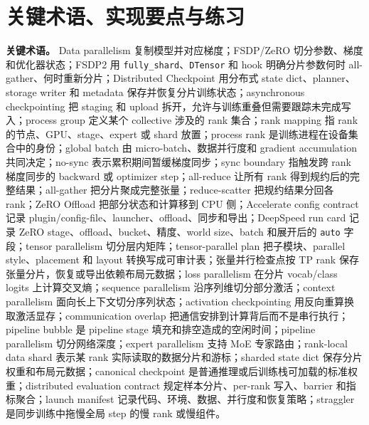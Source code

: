 \documentclass[UTF8,zihao=-4,openany]{ctexbook}
\begin{document}
\section{关键术语、实现要点与练习}
\textbf{关键术语。} Data parallelism 复制模型并对应梯度；FSDP/ZeRO 切分参数、梯度和优化器状态；FSDP2 用 \texttt{fully\_shard}、\texttt{DTensor} 和 hook 明确分片参数何时 all-gather、何时重新分片；Distributed Checkpoint 用分布式 state dict、planner、storage writer 和 metadata 保存并恢复分片训练状态；asynchronous checkpointing 把 staging 和 upload 拆开，允许与训练重叠但需要跟踪未完成写入；process group 定义某个 collective 涉及的 rank 集合；rank mapping 指 rank 的节点、GPU、stage、expert 或 shard 放置；process rank 是训练进程在设备集合中的身份；global batch 由 micro-batch、数据并行度和 gradient accumulation 共同决定；no-sync 表示累积期间暂缓梯度同步；sync boundary 指触发跨 rank 梯度同步的 backward 或 optimizer step；all-reduce 让所有 rank 得到规约后的完整结果；all-gather 把分片聚成完整张量；reduce-scatter 把规约结果分回各 rank；ZeRO Offload 把部分状态和计算移到 CPU 侧；Accelerate config contract 记录 plugin/config-file、launcher、offload、同步和导出；DeepSpeed run card 记录 ZeRO stage、offload、bucket、精度、world size、batch 和展开后的 \texttt{auto} 字段；tensor parallelism 切分层内矩阵；tensor-parallel plan 把子模块、parallel style、placement 和 layout 转换写成可审计表；张量并行检查点按 TP rank 保存张量分片，恢复或导出依赖布局元数据；loss parallelism 在分片 vocab/class logits 上计算交叉熵；sequence parallelism 沿序列维切分部分激活；context parallelism 面向长上下文切分序列状态；activation checkpointing 用反向重算换取激活显存；communication overlap 把通信安排到计算背后而不是串行执行；pipeline bubble 是 pipeline stage 填充和排空造成的空闲时间；pipeline parallelism 切分网络深度；expert parallelism 支持 MoE 专家路由；rank-local data shard 表示某 rank 实际读取的数据分片和游标；sharded state dict 保存分片权重和布局元数据；canonical checkpoint 是普通推理或后训练栈可加载的标准权重；distributed evaluation contract 规定样本分片、per-rank 写入、barrier 和指标聚合；launch manifest 记录代码、环境、数据、并行度和恢复策略；straggler 是同步训练中拖慢全局 step 的慢 rank 或慢组件。
\end{document}
